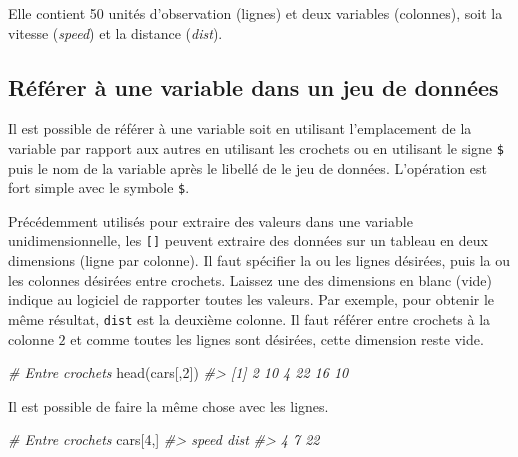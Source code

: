 \documentclass[
]{book}
\newenvironment{Shaded}{}{}
\newcommand{\CommentTok}[1]{\textit{#1}}
\newcommand{\DecValTok}[1]{#1}
\newcommand{\FunctionTok}[1]{#1}
\newcommand{\NormalTok}[1]{#1}
\newcommand{\SpecialCharTok}[1]{#1}
\begin{document}
Elle contient 50 unités d'observation (lignes) et deux variables (colonnes), soit la vitesse (\emph{speed}) et la distance (\emph{dist}).

\hypertarget{ruxe9fuxe9rer-uxe0-une-variable-dans-un-jeu-de-donnuxe9es}{%
\subsection{Référer à une variable dans un jeu de données}\label{ruxe9fuxe9rer-uxe0-une-variable-dans-un-jeu-de-donnuxe9es}}

Il est possible de référer à une variable soit en utilisant l'emplacement de la variable par rapport aux autres en utilisant les crochets ou en utilisant le signe \texttt{\$} puis le nom de la variable après le libellé de le jeu de données. L'opération est fort simple avec le symbole \texttt{\$}.

\begin{Shaded}
\end{Shaded}

Précédemment utilisés pour extraire des valeurs dans une variable unidimensionnelle, les \texttt{{[}{]}} peuvent extraire des données sur un tableau en deux dimensions (ligne par colonne). Il faut spécifier la ou les lignes désirées, puis la ou les colonnes désirées entre crochets. Laissez une des dimensions en blanc (vide) indique au logiciel de rapporter toutes les valeurs. Par exemple, pour obtenir le même résultat, \texttt{dist} est la deuxième colonne. Il faut référer entre crochets à la colonne \(2\) et comme toutes les lignes sont désirées, cette dimension reste vide.

\begin{Shaded}
\begin{Highlighting}[]
\CommentTok{\# Entre crochets}
\FunctionTok{head}\NormalTok{(cars[,}\DecValTok{2}\NormalTok{])}
\CommentTok{\#\textgreater{} [1]  2 10  4 22 16 10}
\end{Highlighting}
\end{Shaded}

Il est possible de faire la même chose avec les lignes.

\begin{Shaded}
\begin{Highlighting}[]
\CommentTok{\# Entre crochets}
\NormalTok{cars[}\DecValTok{4}\NormalTok{,]}
\CommentTok{\#\textgreater{}   speed dist}
\CommentTok{\#\textgreater{} 4     7   22}
\end{Highlighting}
\end{Shaded}
\end{document}
